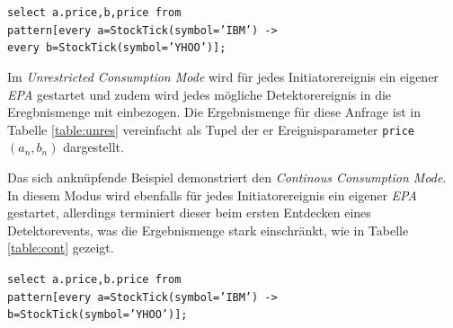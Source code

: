 \documentclass{acm_proc_article-sp}
\begin{document}
\texttt{select a.price,b,price from\\pattern[every a=StockTick(symbol='IBM') ->\\
every b=StockTick(symbol='YHOO')];}

Im \textit{Unrestricted Consumption Mode} wird für jedes Initiatorereignis ein eigener 
\textit{EPA} gestartet und zudem wird jedes mögliche Detektorereignis in die 
Eregbnismenge mit einbezogen. Die Ergebnismenge für diese Anfrage ist in Tabelle 
\ref{table:unres} vereinfacht als Tupel der er Ereignisparameter \texttt{price} 
$(a_n,b_n)$ dargestellt. 


\begin{table}[ht]
    \caption{\textit{Unrestricted Consumption Mode}}
    \label{table:unres}\vspace{0.2cm}
\end{table}


Das sich anknüpfende Beispiel demonstriert den \textit{Continous Consumption Mode}. In 
diesem Modus wird ebenfalls für jedes Initiatorereignis ein eigener \textit{EPA} 
gestartet, allerdings terminiert dieser beim ersten Entdecken eines Detektorevents, was 
die Ergebnismenge stark einschränkt, wie in Tabelle \ref{table:cont} gezeigt.
 
\texttt{select a.price,b.price from\\pattern[every a=StockTick(symbol='IBM') ->\\
b=StockTick(symbol='YHOO')];}
\end{document}
